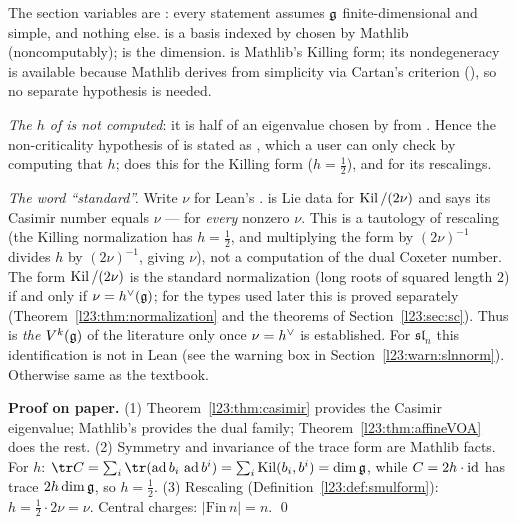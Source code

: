 \begin{dictionary}
The section variables are :
every statement assumes $\mathfrak g$ finite-dimensional and simple, and nothing else.  is a
basis indexed by  chosen by Mathlib (noncomputably);  is the dimension.
 is Mathlib's Killing form; its nondegeneracy 
is available because Mathlib derives  from simplicity via Cartan's criterion
(), so no separate hypothesis is needed.

\emph{The $h$ of  is not computed}: it is half of an eigenvalue chosen by  from
. Hence the non-criticality hypothesis of  is stated as
, which a user can only check by computing that $h$;  does
this for the Killing form ($h=\frac12$), and  for its rescalings.

\emph{The word ``standard''.} Write $\nu$ for Lean's .  is Lie data for $\operatorname{Kil}/(2\nu)$ and
 says its Casimir number equals $\nu$ --- for \emph{every} nonzero $\nu$. This is a tautology of rescaling (the
Killing normalization has $h=\frac12$, and multiplying the form by $(2\nu)^{-1}$ divides $h$ by $(2\nu)^{-1}$, giving $\nu$), not a
computation of the dual Coxeter number. The form $\operatorname{Kil}/(2\nu)$ is the standard normalization (long roots of squared length $2$)
if and only if $\nu=h^\vee(\mathfrak g)$; for the types used later this is proved separately (Theorem~\ref{l23:thm:normalization} and the
 theorems of Section~\ref{l23:sec:sc}). Thus  is \emph{the} $V^k(\mathfrak g)$ of
the literature only once $\nu=h^\vee$ is established. For $\mathfrak{sl}_n$ this identification is not in Lean (see the warning box in Section~\ref{l23:warn:slnnorm}).
Otherwise same as the textbook.
\end{dictionary}

\textbf{Proof on paper.} (1) Theorem~\ref{l23:thm:casimir} provides the Casimir eigenvalue; Mathlib's  provides
the dual family; Theorem~\ref{l23:thm:affineVOA} does the rest. (2) Symmetry and invariance of the trace form are Mathlib
facts. For $h$: $\tr\lxxiiiCas=\sum_i\tr(\lxxiiiad b_i\,\lxxiiiad b^i)=\sum_i\lxxiiiKil(b_i,b^i)=\dim\lxxiiig$, while
$C=2h\cdot\mathrm{id}$ has trace $2h\dim\mathfrak g$, so $h=\frac12$. (3) Rescaling (Definition~\ref{l23:def:smulform}):
$h=\tfrac12\cdot 2\nu=\nu$. Central charges: $|\mathrm{Fin}\,n|=n$. \qed

